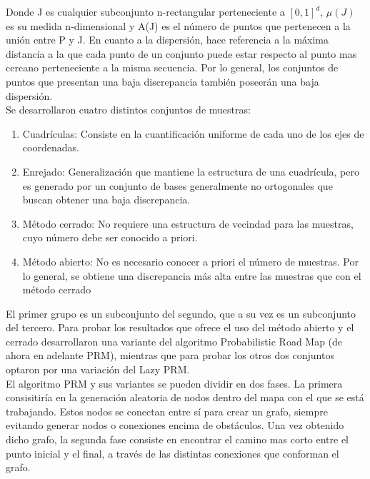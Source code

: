 Donde J es cualquier subconjunto n-rectangular perteneciente a $[0,1]^{d}$, $\mu(J)$ es su medida n-dimensional y A(J) es el número de puntos que pertenecen a la unión entre P y J. En cuanto a la dispersión, hace referencia a la máxima distancia a la que cada punto de un conjunto puede estar respecto al punto mas cercano perteneciente a la misma secuencia. Por lo general, los conjuntos de puntos que presentan una baja discrepancia también poseerán una baja dispersión.
\\

Se desarrollaron cuatro distintos conjuntos de muestras:
\begin{enumerate}
\item Cuadrículas: Consiste en la cuantificación uniforme de cada uno de los ejes de coordenadas.
\item Enrejado: Generalización que mantiene la estructura de una cuadrícula, pero es generado por un conjunto de bases generalmente no ortogonales que buscan obtener una baja discrepancia.
\item Método cerrado: No requiere una estructura de vecindad para las muestras, cuyo número debe ser conocido a priori.
\item Método abierto: No es necesario conocer a priori el número de muestras. Por lo general, se obtiene una discrepancia más alta entre las muestras que con el método cerrado 
\end{enumerate}

El primer grupo es un subconjunto del segundo, que a su vez es un subconjunto del tercero. Para probar los resultados que ofrece el uso del método abierto y el cerrado desarrollaron una variante del algoritmo Probabilistic Road Map (de ahora en adelante PRM), mientras que para probar los otros dos conjuntos optaron por una variación del Lazy PRM.
\\

El algoritmo PRM y sus variantes se pueden dividir en dos fases. La primera consisitiría en la generación aleatoria de nodos dentro del mapa con el que se está trabajando. Estos nodos se conectan entre sí para crear un grafo, siempre evitando generar nodos o conexiones encima de obstáculos. Una vez obtenido dicho grafo, la segunda fase consiste en encontrar el camino mas corto entre el punto inicial y el final, a través de las distintas conexiones que conforman el grafo.
\\

